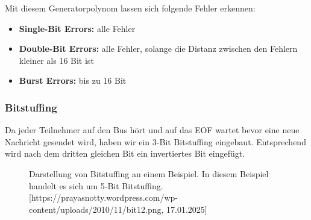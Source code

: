 Mit diesem Generatorpolynom lassen sich folgende Fehler erkennen:
\begin{itemize}
	\item \textbf{Single-Bit Errors:} alle Fehler
	
	\item \textbf{Double-Bit Errors:} alle Fehler, solange die Distanz zwischen den Fehlern kleiner als 16 Bit ist
	
	\item \textbf{Burst Errors:} bis zu 16 Bit 
\end{itemize}

\subsubsection{Bitstuffing}
Da jeder Teilnehmer auf den Bus hört und auf das EOF wartet bevor eine neue Nachricht gesendet wird, haben wir ein 3-Bit Bitstuffing eingebaut. Entsprechend wird nach dem dritten gleichen Bit ein invertiertes Bit eingefügt.

\begin{figure}[H]
	\centering    
	\caption{Darstellung von Bitstuffing an einem Beispiel. In diesem Beispiel handelt es sich um 5-Bit Bitstuffing. [https://prayasnotty.wordpress.com/wp-content/uploads/2010/11/bit12.png, 17.01.2025]}
	\label{bitstuffing}
\end{figure}